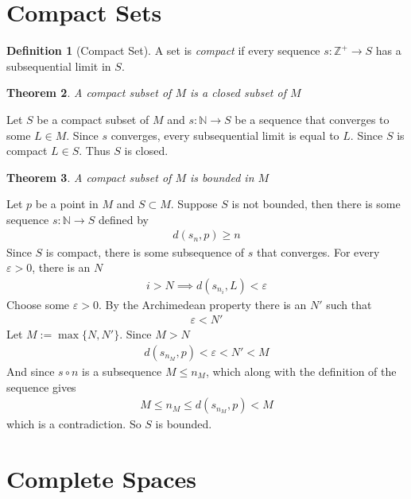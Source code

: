 \documentclass{amsart}
\numberwithin{equation}{section}
\let\oldendproof\endproof
\renewenvironment{proof}[1][\proofname]{%
  \setcounter{case}{0}
  \setcounter{step}{0}
  \oldproof[#1]%
}{\oldendproof}
\theoremstyle{plain}
\newtheorem{theorem}{Theorem}[section]
\theoremstyle{definition}
\newtheorem{definition}[theorem]{Definition}
\theoremstyle{remark}
\begin{document}
\section{Compact Sets}

\begin{definition}[Compact Set]
  A set is \emph{compact} if every sequence $s:\mathbb{Z}^+ \to S$ has a subsequential limit in $S$.
\end{definition}

\begin{theorem}
  A compact subset of $M$ is a closed subset of $M$
\end{theorem}
\begin{proof}
  Let $S$ be a compact subset of $M$ and $s: \mathbb{N} \to S$ be a sequence that converges to some $L\in M$. Since $s$ converges, every subsequential limit is equal to $L$. Since $S$ is compact $L\in S$. Thus $S$ is closed.
\end{proof}

\begin{theorem}
  A compact subset of $M$ is bounded in $M$
\end{theorem}
\begin{proof}
  Let $p$ be a point in $M$ and $S\subset M$. Suppose $S$ is not bounded, then there is some sequence $s:\mathbb{N}\to S$ defined by 
  \begin{align}
    d(s_n, p) \geq n
  \end{align}
  Since $S$ is compact, there is some subsequence of $s$ that converges. For every $\varepsilon>0$, there is an $N$
  \begin{align}
    i> N \implies d(s_{n_i} , L) < \varepsilon
  \end{align}
  Choose some $\varepsilon >0$. By the Archimedean property there is an $N'$ such that
  \begin{align}
    \varepsilon < N '
  \end{align}
  Let $M:= \max\{N,N'\}$. Since $M> N$
  \begin{align}
    d(s_{n_M} , p) < \varepsilon < N' < M
  \end{align}
  And since $s\circ n$ is a subsequence $M \leq n_M$, which along with the definition of the sequence gives
  \begin{align}
    M \leq n_M \leq d(s_{n_M} , p) < M
  \end{align}
  which is a contradiction. So $S$ is bounded.
\end{proof}


\section{Complete Spaces}
\end{document}

